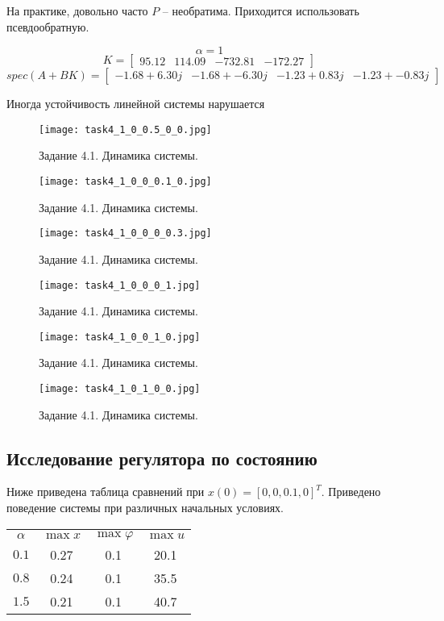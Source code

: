 На практике, довольно часто \(P\) -- необратима. Приходится использовать псевдообратную.

\[\alpha = 1\]
\[K = \begin{bmatrix}
    95.12 &  114.09 & -732.81 & -172.27
  \end{bmatrix}\]
  \[spec(A + B K) = \begin{bmatrix}
   -1.68 + 6.30j & -1.68 + -6.30j & -1.23 + 0.83j & -1.23 + -0.83j
  \end{bmatrix}\]

  Иногда устойчивость линейной системы нарушается
  \begin{figure}[]
    \centering
    \texttt{[image: task4\_1\_0\_0.5\_0\_0.jpg]}
    \caption{Задание 4.1. Динамика системы.}
    \label{fig:task4_1_1}
\end{figure}

\begin{figure}[]
    \centering
    \texttt{[image: task4\_1\_0\_0\_0.1\_0.jpg]}
    \caption{Задание 4.1. Динамика системы.}
    \label{fig:task4_1_2}
\end{figure}

\begin{figure}[]
    \centering
    \texttt{[image: task4\_1\_0\_0\_0\_0.3.jpg]}
    \caption{Задание 4.1. Динамика системы.}
    \label{fig:task4_1_3}
\end{figure}

\begin{figure}[]
    \centering
    \texttt{[image: task4\_1\_0\_0\_0\_1.jpg]}
    \caption{Задание 4.1. Динамика системы.}
    \label{fig:task4_1_4}
\end{figure}

\begin{figure}[]
    \centering
    \texttt{[image: task4\_1\_0\_0\_1\_0.jpg]}
    \caption{Задание 4.1. Динамика системы.}
    \label{fig:task4_1_5}
\end{figure}

\begin{figure}[]
    \centering
    \texttt{[image: task4\_1\_0\_1\_0\_0.jpg]}
    \caption{Задание 4.1. Динамика системы.}
    \label{fig:task4_1_6}
\end{figure}



\subsection{Исследование регулятора по состоянию}
Ниже приведена таблица сравнений при \(x(0) = [0, 0, 0.1, 0]^T\). Приведено поведение системы при различных начальных условиях.
\begin{center}
    \begin{tabular}{ c | c c c }
$\alpha$ & $\max x$ & $\max \varphi$ & $\max u$ \\
        $0.1$ & 0.27 & 0.1 & 20.1 \\
        $0.8$ & 0.24 & 0.1 & 35.5 \\
        $1.5$ & 0.21 & 0.1 & 40.7 \\
    \end{tabular}
\end{center}

